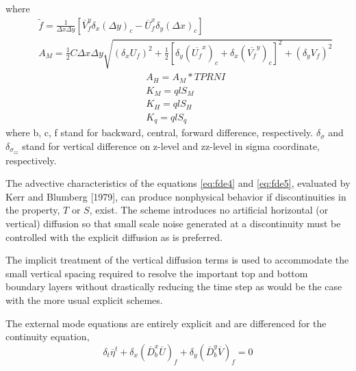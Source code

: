 \documentclass[oribibl]{llncs}
\begin{document}
where
\begin{eqnarray}
&&\tilde {f} = \frac{1}{\Delta x \Delta y} [ \overline {V}^y_f \delta_x(\Delta y)_c - \overline {U}^x_f \delta_y(\Delta x)_c ]  \\
&&A_M = \frac{1}{2} C \Delta x \Delta y \sqrt{  (\delta_xU_f)^2 + \frac{1}{2}[\delta_y (\overline{U_f}^x)_c+\delta_x (\overline{V_f}^y)_c]^2 + (\delta_yV_f)^2  } 
\end{eqnarray}
\begin{eqnarray}
&&A_H = A_M * TPRNI \\
&&K_M = qlS_M \\
&&K_H = qlS_H \\
&&K_q = qlS_q 
\end{eqnarray}
where b, c, f stand for backward, central, forward difference, respectively. ${\delta_\sigma}$ and ${\delta_{\sigma_{zz}}}$ stand for vertical difference on z-level and zz-level in sigma coordinate, respectively. 
 
The advective characteristics of the equations \ref{eq:fde4} and \ref{eq:fde5}, evaluated by Kerr and Blumberg [1979], can produce nonphysical behavior if discontinuities in the property, $T$ or $S$, exist. The scheme introduces no artificial horizontal (or vertical) diffusion so that small scale noise generated at a discontinuity must be controlled with the explicit diffusion as is preferred.

The implicit treatment of the vertical diffusion terms is used to accommodate the small vertical spacing required to resolve the important top and bottom boundary layers without drastically reducing the time step as would be the case with the more usual explicit schemes. 

The external mode equations are entirely explicit and are differenced for the continuity equation,
\begin{equation}
\delta_t \overline{\eta}^t + \delta_x (\overline{D}^x_b \overline{U})_f + \delta_y (\overline{D}^y_b \overline{V})_f = 0
\end{equation}
\end{document}
